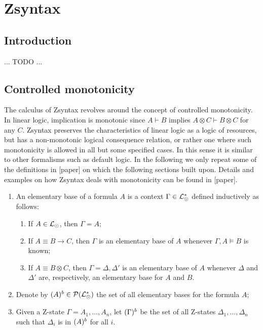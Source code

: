 \section{Zsyntax}

\subsection{Introduction}

... TODO ...

\subsection{Controlled monotonicity}

The calculus of Zsyntax revolves around the concept of controlled monotonicity.
In linear logic, implication is monotonic since $A \vdash B$ implies
$A \otimes C \vdash B \otimes C$ for any $C$. Zsyntax preserves the
characteristics of linear logic as a logic of resources, but has a non-monotonic
logical consequence relation, or rather one where such monotonicity is allowed
in all but some specified cases. In this sense it is similar to other formalisms
such as default logic. In the following we only repeat some of the definitions
in [paper] on which the following sections built upon. Details and examples on
how Zsyntax deals with monotonicity can be found in [paper].

\begin{definition}
  \begin{enumerate}
  \item An elementary base of a formula $A$ is a context
    $\Gamma \in \mathcal{L}_{\odot}^*$ defined inductively as follows:

    \begin{enumerate}
    \item If $A \in \mathcal{L}_{\odot}$, then $\Gamma = A$;
    \item If $A \equiv B \rightarrow C$, then $\Gamma$ is an elementary base of
      $A$ whenever $\Gamma, A \models B$ is known;
    \item If $A \equiv B \otimes C$, then $\Gamma = \Delta, \Delta'$ is an
      elementary base of $A$ whenever $\Delta$ and $\Delta'$ are, respectively,
      an elementary base for $A$ and $B$.
    \end{enumerate}

  \item Denote by $(A)^{b} \in \mathcal{P}(\mathcal{L}_{\odot}^*)$ the set of all
    elementary bases for the formula $A$;
  \item Given a Z-state $\Gamma = A_1, \dots, A_n$, let $(\Gamma)^{b}$ be
    the set of all Z-states $\Delta_1, \dots, \Delta_n$ such that $\Delta_i$ is
    in $(A)^{b}$ for all $i$.
  \end{enumerate}
\end{definition}

